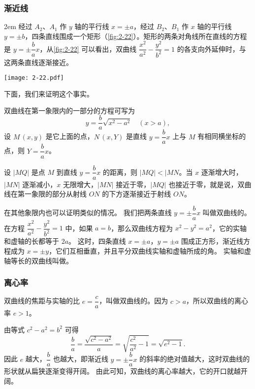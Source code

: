 \subsubsection{渐近线}
\noindent
\begin{minipage}{0.6\linewidth}\parindent2em\linespread{1.6}\selectfont
经过 $A_2$、$A_1$ 作 $y$ 轴的平行线 $x=\pm a$，经过 $B_2$、$B_1$ 作 $x$ 轴的平行线 $y=\pm b$，四条直线围成一个矩形（\cref{fig:2-22}）。矩形的两条对角线所在直线的方程是 $y=\pm\dfrac{b}{a}x$，从\cref{fig:2-22} 可以看出，双曲线 $\dfrac{x^2}{a^2}-\dfrac{y^2}{b^2}=1$ 的各支向外延伸时，与这两条直线逐渐接近。
\end{minipage}\hfill
\begin{minipage}{0.35\linewidth}\centering
\begin{figurehere}
  \texttt{[image: 2-22.pdf]}
  \caption{}\label{fig:2-22}
\end{figurehere}
\end{minipage}

下面，我们来证明这个事实。

双曲线在第一象限内的一部分的方程可写为
\[y=\frac{b}{a}\sqrt{x^2-a^2}\quad(x>a),\]
设 $M\,(x,y)$ 是它上面的点，$N\,(x,Y)$ 是直线 $y=\dfrac{b}{a}x$ 上与 $M$ 有相同横坐标的点，则 $Y=\dfrac{b}{a}x$。

设 $|MQ|$ 是点 $M$ 到直线 $y=\dfrac{b}{a}x$ 的距离，则 $|MQ|<|MN$。当 $x$ 逐渐增大时，$|MN|$ 逐渐减小，$x$ 无限增大，$|MN|$ 接近于零，$|MQ|$ 也接近于零，就是说，双曲线在第一象限的部分从射线 $ON$ 的下方逐渐接近于射线 $ON$。

在其他象限内也可以证明类似的情况。
我们把两条直线 $y=\pm\dfrac{b}{a}x$ 叫做双曲线的。
在方程 $\dfrac{x^2}{a^2}-\dfrac{y^2}{b^2}=1$ 中，如果 $a=b$，那么双曲线方程为 $x^2-y^2=a^2$，它的实轴和虚轴的长都等于 $2a$。
这时，四条直线 $x=\pm a$，$y=\pm a$ 围成正方形，渐近线方程成为 $x=\pm y$，它们互相垂直，并且平分双曲线实轴和虚轴所成的角。
实轴和虚轴等长的双曲线叫做。

\subsubsection{离心率}
双曲线的焦距与实轴的比 $e=\dfrac{c}{a}$，叫做双曲线的。因为 $c> a$，所以双曲线的离心率 $e>1$。

由等式 $c^2-a^2=b^2$ 可得
\[\frac{b}{a}=\frac{\sqrt{c^2-a^2}}{a}=\sqrt{\frac{c^2}{a^2}-1}=\sqrt{e^2-1} .\]
因此 $e$ 越大，$\dfrac{b}{a}$ 也越大，即渐近线 $y=\pm\dfrac{b}{a}x$ 的斜率的绝对值越大，这时双曲线的形状就从扁狭逐渐变得开阔。
由此可知，双曲线的离心率越大，它的开口就越开阔。

